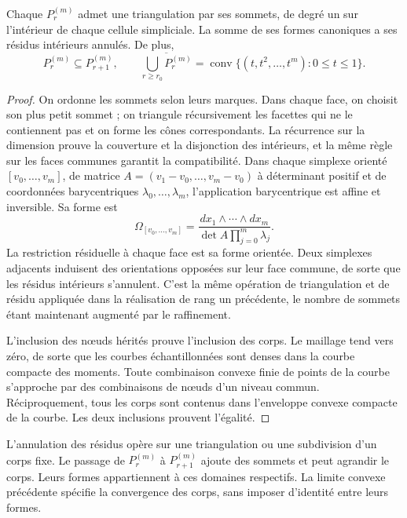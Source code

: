 \begin{proposition}
\label{prop:dim-polytopes}
Chaque \(P_r^{(m)}\) admet une triangulation par ses sommets, de
degré un sur l’intérieur de chaque cellule simpliciale. La somme de ses
formes canoniques a ses résidus intérieurs annulés. De plus,
\[
 P_r^{(m)}\subseteq P_{r+1}^{(m)},\qquad
 \overline{\bigcup_{r\geq r_0}P_r^{(m)}}=
 \operatorname{conv}\{(t,t^2,\ldots,t^m):0\leq t\leq1\}.
\]
\end{proposition}
\begin{proof}
On ordonne les sommets selon leurs marques. Dans chaque face, on choisit son plus petit
sommet ; on triangule récursivement les facettes qui ne le contiennent pas
et on forme les cônes correspondants. La récurrence sur la dimension
prouve la couverture et la disjonction des intérieurs, et la même règle sur les faces
communes garantit la compatibilité. Dans chaque simplexe orienté
\([v_0,\ldots,v_m]\), de matrice
\(A=(v_1-v_0,\ldots,v_m-v_0)\) à déterminant positif et de
coordonnées barycentriques \(\lambda_0,\ldots,\lambda_m\),
l’application barycentrique est affine et inversible. Sa forme est
\[
 \Omega_{[v_0,\ldots,v_m]}=
 \frac{dx_1\wedge\cdots\wedge dx_m}
 {\det A\prod_{j=0}^{m}\lambda_j}.
\]
La restriction résiduelle à chaque face est sa forme orientée. Deux simplexes adjacents induisent des orientations opposées sur leur face commune, de sorte que les résidus intérieurs s'annulent. C'est la même opération de triangulation et de résidu appliquée dans la réalisation de rang un précédente, le nombre de sommets étant maintenant augmenté par le raffinement.

L’inclusion des nœuds hérités prouve l’inclusion des corps. Le maillage
tend vers zéro, de sorte que les courbes échantillonnées sont denses dans la courbe
compacte des moments. Toute combinaison convexe finie de points de la
courbe s’approche par des combinaisons de nœuds d’un niveau commun.
Réciproquement, tous les corps sont contenus dans l’enveloppe
convexe compacte de la courbe. Les deux inclusions prouvent l’égalité.
\end{proof}

L'annulation des résidus opère sur une triangulation ou une subdivision d'un corps fixe. Le passage de \(P_r^{(m)}\) à \(P_{r+1}^{(m)}\) ajoute des sommets et peut agrandir le corps. Leurs formes appartiennent à ces domaines respectifs. La limite convexe précédente spécifie la convergence des corps, sans imposer d'identité entre leurs formes.

